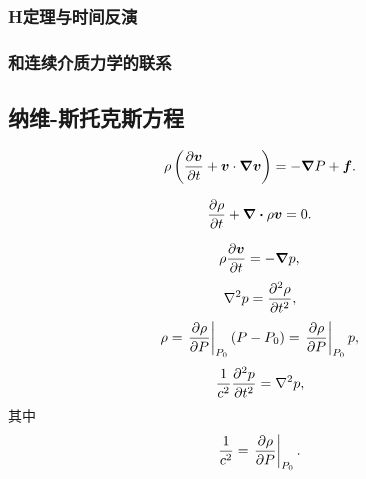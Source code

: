 \documentclass[hyperref, UTF8, a4paper]{ctexart}
\begin{document}
\subsubsection{H定理与时间反演}



\subsubsection{和连续介质力学的联系}

\subsection{纳维-斯托克斯方程}

\begin{equation}
    \rho \left( \pdv{\vb*{v}}{t} + \vb*{v} \cdot \grad{\vb*{v}} \right) = - \grad{P} + \vb*{f}.
\end{equation}

\begin{equation}
    \pdv{\rho}{t} + \div{\rho \vb*{v}} = 0.
\end{equation}

\[
    \rho \pdv{\vb*{v}}{t} = - \grad{p},
\]
\[
    \laplacian{p} = \pdv[2]{\rho}{t},
\]
\[
    \rho = \eval{\pdv{\rho}{P}}_{P_0} (P - P_0) = \eval{\pdv{\rho}{P}}_{P_0} p,
\]
\begin{equation}
    \frac{1}{c^2} \pdv[2]{p}{t} = \laplacian{p},
\end{equation}
其中
\begin{equation}
    \frac{1}{c^2} = \eval{\pdv{\rho}{P}}_{P_0}.
\end{equation}
\end{document}
